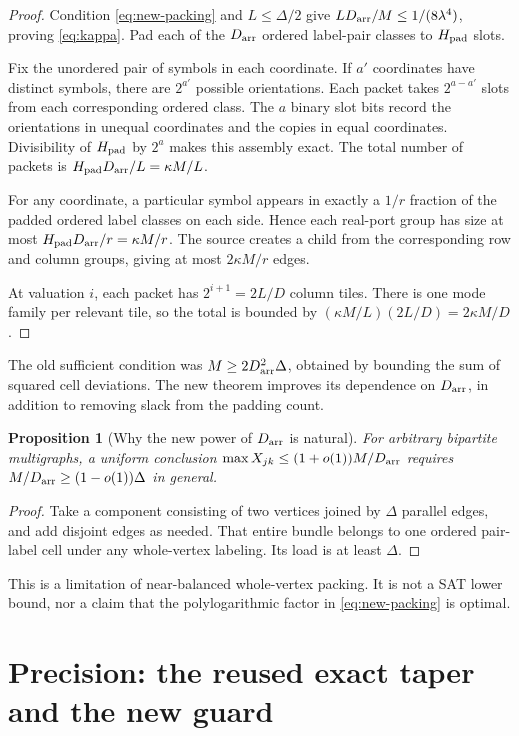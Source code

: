 \documentclass[11pt,letterpaper]{article}
\numberwithin{equation}{section}
\newtheorem{proposition}[theorem]{Proposition}
\theoremstyle{definition}\newtheorem{definition}[theorem]{Definition}
\theoremstyle{remark}\newtheorem{remark}[theorem]{Remark}
\newcommand{\Darr}{D_{\rm arr}}
\newcommand{\Hpad}{H_{\rm pad}}
\begin{document}
\begin{proof}
Condition \eqref{eq:new-packing} and $L\le\Delta/2$ give
$L\Darr/M\le1/(8\lambda^4)$, proving \eqref{eq:kappa}.
Pad each of the $\Darr$ ordered label-pair classes to $\Hpad$ slots.

Fix the unordered pair of symbols in each coordinate. If $a'$ coordinates
have distinct symbols, there are $2^{a'}$ possible orientations. Each
packet takes $2^{a-a'}$ slots from each corresponding ordered class.
The $a$ binary slot bits record the orientations in unequal coordinates
and the copies in equal coordinates. Divisibility of $\Hpad$ by $2^a$
makes this assembly exact. The total number of packets is
$\Hpad\Darr/L=\kappa M/L$.

For any coordinate, a particular symbol appears in exactly a $1/r$
fraction of the padded ordered label classes on each side. Hence each
real-port group has size at most $\Hpad\Darr/r=\kappa M/r$.
The source creates a child from the corresponding row and column groups,
giving at most $2\kappa M/r$ edges.

At valuation $i$, each packet has $2^{i+1}=2L/D$ column tiles.
There is one mode family per relevant tile, so the total is bounded
by $(\kappa M/L)(2L/D)=2\kappa M/D$.
\end{proof}

The old sufficient condition was $M\ge2\Darr^2\Delta$, obtained by
bounding the sum of squared cell deviations. The new theorem improves
its dependence on $\Darr$, in addition to removing slack from the
padding count.

\begin{proposition}[Why the new power of $\Darr$ is natural]
For arbitrary bipartite multigraphs, a uniform conclusion
$\max X_{jk}\le(1+o(1))M/\Darr$ requires
$M/\Darr\ge(1-o(1))\Delta$ in general.
\end{proposition}
\begin{proof}
Take a component consisting of two vertices joined by $\Delta$ parallel
edges, and add disjoint edges as needed. That entire bundle belongs to
one ordered pair-label cell under any whole-vertex labeling.
Its load is at least $\Delta$.
\end{proof}
This is a limitation of near-balanced whole-vertex packing. It is not
a SAT lower bound, nor a claim that the polylogarithmic factor in
\eqref{eq:new-packing} is optimal.

\section{Precision: the reused exact taper and the new guard}
\label{sec:precision}
\end{document}
